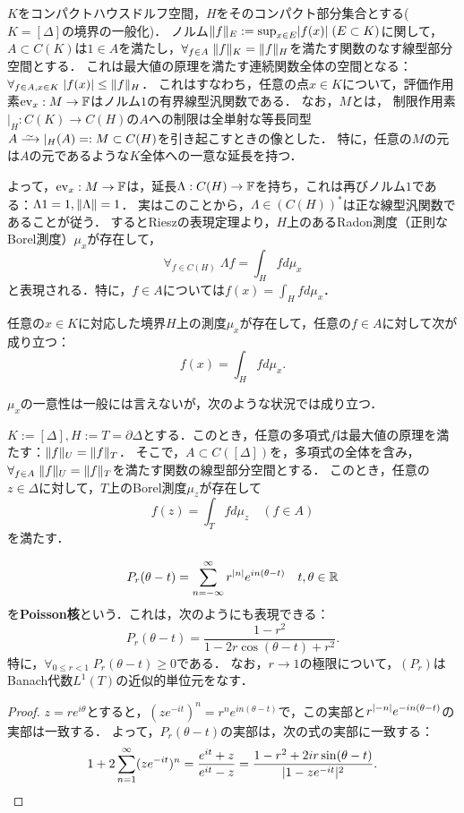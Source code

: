 \documentclass[uplatex,dvipdfmx]{jsreport}
\begin{document}
\begin{notation}
    $K$をコンパクトハウスドルフ空間，$H$をそのコンパクト部分集合とする($K=[\Delta]$の境界の一般化)．
    ノルム$\|f\|_E:=\sup_{x\in E}\lvert f(x)\rvert\;(E\subset K)$に関して，
    $A\subset C(K)$は$1\in A$を満たし，$\forall_{f\in A}\;\|f\|_K=\|f\|_H$を満たす関数のなす線型部分空間とする．
    これは最大値の原理を満たす連続関数全体の空間となる：$\forall_{f\in A,x\in K}\;\lvert f(x)\rvert\le\|f\|_H$．
    これはすなわち，任意の点$x\in K$について，評価作用素$\mathrm{ev}_x:M\to\mathbb{F}$はノルム$1$の有界線型汎関数である．
    なお，$M$とは，
    制限作用素$|_H:C(K)\to C(H)$の$A$への制限は全単射な等長同型$A\iso |_H(A)=:M\subset C(H)$を引き起こすときの像とした．
    特に，任意の$M$の元は$A$の元であるような$K$全体への一意な延長を持つ．
    
    よって，$\mathrm{ev}_x:M\to\mathbb{F}$は，延長$\Lambda:C(H)\to\mathbb{F}$を持ち，これは再びノルム$1$である：$\Lambda 1=1,\|\Lambda\|=1$．
    実はこのことから，$\Lambda\in (C(H))^*$は正な線型汎関数であることが従う．
    するとRieszの表現定理より，$H$上のあるRadon測度（正則なBorel測度）$\mu_x$が存在して，
    \[\forall_{f\in C(H)}\;\Lambda f=\int_Hfd\mu_x\]
    と表現される．特に，$f\in A$については$f(x)=\int_Hfd\mu_x$．
\end{notation}

\begin{proposition}
    任意の$x\in K$に対応した境界$H$上の測度$\mu_x$が存在して，任意の$f\in A$に対して次が成り立つ：
    \[f(x)=\int_Hfd\mu_x.\]
\end{proposition}

$\mu_x$の一意性は一般には言えないが，次のような状況では成り立つ．

\begin{example}[Poisson積分の設定]
    $K:=[\Delta],H:=T=\partial\Delta$とする．このとき，任意の多項式$f$は最大値の原理を満たす：$\|f\|_U=\|f\|_T$．
    そこで，$A\subset C([\Delta])$を，多項式の全体を含み，$\forall_{f\in A}\;\|f\|_U=\|f\|_T$を満たす関数の線型部分空間とする．
    このとき，任意の$z\in\Delta$に対して，$T$上のBorel測度$\mu_z$が存在して
    \[f(z)=\int_Tfd\mu_z\quad(f\in A)\]
    を満たす．
\end{example}

\begin{definition}
    \[P_r(\theta-t)=\sum^\infty_{n=-\infty}r^{\lvert n\rvert}e^{in(\theta-t)}\quad t,\theta\in\mathbb{R}\]
    を\textbf{Poisson核}という．これは，次のようにも表現できる：
    \[P_r(\theta-t)=\frac{1-r^2}{1-2r\cos(\theta-t)+r^2}.\]
    特に，$\forall_{0\le r<1}\;P_r(\theta-t)\ge0$である．
    なお，$r\to1$の極限について，$(P_r)$はBanach代数$L^1(T)$の近似的単位元をなす．
\end{definition}
\begin{proof}
    $z=re^{i\theta}$とすると，$(ze^{-it})^{n}=r^ne^{in(\theta-t)}$で，この実部と$r^{\lvert-n\rvert}e^{-in(\theta-t)}$の実部は一致する．
    よって，$P_r(\theta-t)$の実部は，次の式の実部に一致する：
    \[1+2\sum^\infty_{n=1}(ze^{-it})^n=\frac{e^{it}+z}{e^{it}-z}=\frac{1-r^2+2ir\sin(\theta-t)}{\lvert1-ze^{-it}\rvert^2}.\]
\end{proof}
\end{document}
